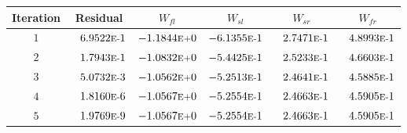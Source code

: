 \begin{tabular*}{\textwidth}{@{\extracolsep{\fill}} cccccc}
\\ 
\hline 
\hline 
Iteration & Residual & $W_{fl}$ & $W_{sl}$ & $W_{sr}$ & $W_{fr}$ \\ 
\hline 
$1$ & $\phantom{-} 6.9522\mbox{\sc{e}\smaller{-}}1$ & $-1.1844\mbox{\sc{e}\smaller{+}}0$ & $-6.1355\mbox{\sc{e}\smaller{-}}1$ & $\phantom{-} 2.7471\mbox{\sc{e}\smaller{-}}1$ & $\phantom{-} 4.8993\mbox{\sc{e}\smaller{-}}1$ \\ 
$2$ & $\phantom{-} 1.7943\mbox{\sc{e}\smaller{-}}1$ & $-1.0832\mbox{\sc{e}\smaller{+}}0$ & $-5.4425\mbox{\sc{e}\smaller{-}}1$ & $\phantom{-} 2.5233\mbox{\sc{e}\smaller{-}}1$ & $\phantom{-} 4.6603\mbox{\sc{e}\smaller{-}}1$ \\ 
$3$ & $\phantom{-} 5.0732\mbox{\sc{e}\smaller{-}}3$ & $-1.0562\mbox{\sc{e}\smaller{+}}0$ & $-5.2513\mbox{\sc{e}\smaller{-}}1$ & $\phantom{-} 2.4641\mbox{\sc{e}\smaller{-}}1$ & $\phantom{-} 4.5885\mbox{\sc{e}\smaller{-}}1$ \\ 
$4$ & $\phantom{-} 1.8160\mbox{\sc{e}\smaller{-}}6$ & $-1.0567\mbox{\sc{e}\smaller{+}}0$ & $-5.2554\mbox{\sc{e}\smaller{-}}1$ & $\phantom{-} 2.4663\mbox{\sc{e}\smaller{-}}1$ & $\phantom{-} 4.5905\mbox{\sc{e}\smaller{-}}1$ \\ 
$5$ & $\phantom{-} 1.9769\mbox{\sc{e}\smaller{-}}9$ & $-1.0567\mbox{\sc{e}\smaller{+}}0$ & $-5.2554\mbox{\sc{e}\smaller{-}}1$ & $\phantom{-} 2.4663\mbox{\sc{e}\smaller{-}}1$ & $\phantom{-} 4.5905\mbox{\sc{e}\smaller{-}}1$ \\ 
\hline 
\end{tabular*} 
